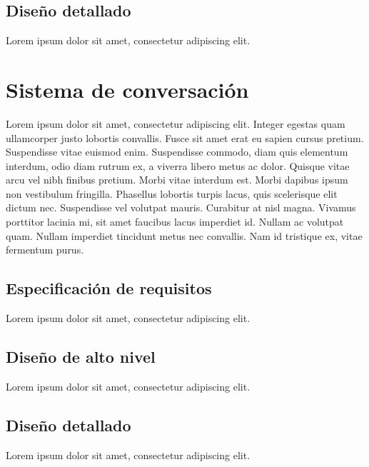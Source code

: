 \subsection{Diseño detallado}

Lorem ipsum dolor sit amet, consectetur adipiscing elit.

\section{Sistema de conversación}

Lorem ipsum dolor sit amet, consectetur adipiscing elit. Integer egestas quam ullamcorper justo lobortis convallis. Fusce sit amet erat eu sapien cursus pretium. Suspendisse vitae euismod enim. Suspendisse commodo, diam quis elementum interdum, odio diam rutrum ex, a viverra libero metus ac dolor. Quisque vitae arcu vel nibh finibus pretium. Morbi vitae interdum est. Morbi dapibus ipsum non vestibulum fringilla. Phasellus lobortis turpis lacus, quis scelerisque elit dictum nec. Suspendisse vel volutpat mauris. Curabitur at nisl magna. Vivamus porttitor lacinia mi, sit amet faucibus lacus imperdiet id. Nullam ac volutpat quam. Nullam imperdiet tincidunt metus nec convallis. Nam id tristique ex, vitae fermentum purus.

\subsection{Especificación de requisitos}

Lorem ipsum dolor sit amet, consectetur adipiscing elit.

\subsection{Diseño de alto nivel}

Lorem ipsum dolor sit amet, consectetur adipiscing elit.

\subsection{Diseño detallado}

Lorem ipsum dolor sit amet, consectetur adipiscing elit.
